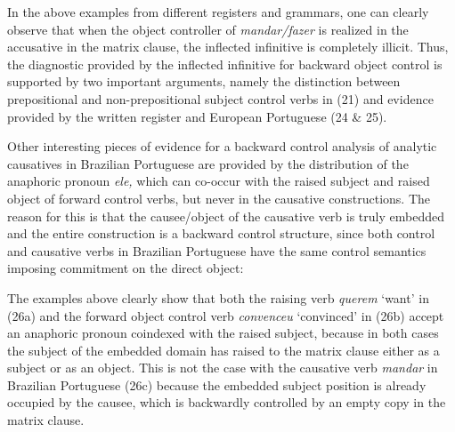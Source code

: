 \documentclass[output=paper]{langsci/langscibook}
\begin{document}
In the above examples from different registers and grammars, one can clearly observe that when the object controller of \textit{mandar/fazer}\textbf{ }is realized in the accusative in the matrix clause, the inflected infinitive is completely illicit. Thus, the diagnostic provided by the inflected infinitive for backward object control is supported by two important arguments, namely the distinction between prepositional and non{}-prepositional subject control verbs in (21) and evidence provided by the written register and European Portuguese (24 \& 25).

Other interesting pieces of evidence for a backward control analysis of analytic causatives in Brazilian Portuguese are provided by the distribution of the anaphoric pronoun \textit{ele,} which can co-occur with the raised subject and raised object of forward control verbs, but never in the causative constructions. The reason for this is that the causee/object of the causative verb is truly embedded and the entire construction is a backward control structure, since both control and causative verbs in Brazilian Portuguese have the same control semantics imposing commitment on the direct object:

\ea%
    \label{ex:moreno:26}
    \z
\z
    
The examples above clearly show that both the raising verb \textit{querem} ‘want’ in (26a) and the forward object control verb \textit{convenceu} ‘convinced’ in (26b) accept an anaphoric pronoun coindexed with the raised subject, because in both cases the subject of the embedded domain has raised to the matrix clause either as a subject or as an object. This is not the case with the causative verb \textit{mandar} in Brazilian Portuguese (26c) because the embedded subject position is already occupied by the causee, which is backwardly controlled by an empty copy in the matrix clause. 
\end{document}
